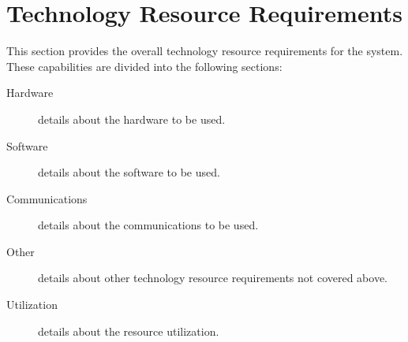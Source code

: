 \KNEADSECTIONNEWPAGE
\section{Technology Resource Requirements}
\label{lab:sec_TechnologyResourceRequirements}


This section provides the overall technology resource requirements for the system. 
These capabilities are divided into the following sections:
\begin{description}
	\item[Hardware] details about the hardware to be used. 
	\item[Software] details about the software to be used.
	\item[Communications] details about the communications to be used.
	\item[Other] details about other technology resource requirements not covered above.
	\item[Utilization] details about the resource utilization.
\end{description}

